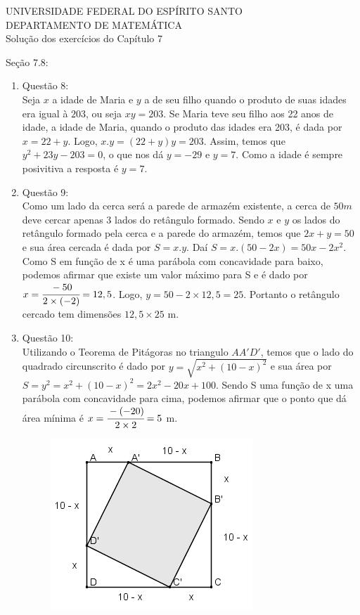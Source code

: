 \documentclass[a4paper]{report}
\begin{document}
\begin{center}
UNIVERSIDADE FEDERAL DO ESPÍRITO SANTO\\DEPARTAMENTO DE MATEMÁTICA\\
\vspace{0.6cm}
Solução dos exercícios do Capítulo 7
\vspace{0.2cm}

\end{center}
Seção 7.8:
\begin{enumerate}
		\item Questão 8:\\Seja $x$ a idade de Maria e $y$ a de seu filho quando o produto de suas idades era igual à $203$, ou seja $xy=203$. Se Maria teve seu filho aos 22 anos de idade, a idade de Maria, quando o produto das idades era 203, é dada por $x = 22 + y$. Logo, $x.y = (22 + y)y = 203$. Assim, temos que $y^2 + 23y - 203 = 0$, o que nos dá $y = -29$ e $y = 7$. Como a idade é sempre posivitiva a resposta é $y = 7$.
		
		\item Questão 9:\\Como um lado da cerca será a parede de armazém existente, a cerca de $50 m$ deve cercar apenas $3$ lados do retângulo formado. Sendo $x$ e $y$ os lados do retângulo formado pela cerca e a parede do armazém, temos que $2x+y=50$ e sua área cercada é dada por $S = x.y$. Daí $S = x.(50 - 2x) = 50x - 2x^2$. Como S em função de x é uma parábola com concavidade para baixo, podemos afirmar que existe um valor máximo para S e é dado por $x=\cfrac{-50}{2\times(-2)} = 12,5$. Logo, $y = 50 - 2\times12,5 = 25$. Portanto o retângulo cercado tem dimensões $12,5\times 25$ m.

		\item Questão 10:\\Utilizando o Teorema de Pitágoras no triangulo $AA'D'$, temos que o lado do quadrado circunscrito é dado por $y=\sqrt{x^2+ (10-x)^2}$ e sua área por $S = y^2 = x^2+ (10-x)^2 = 2x^2-20x+100$. Sendo S uma função de x uma parábola com concavidade para cima, podemos afirmar que o ponto que dá área mínima é $x=\cfrac{-(-20)}{2\times2}=5$ m.
		{
			\begin{figure}[!th]
				\centering
			 	\includegraphics[height=0.3\linewidth]{q10.png}
			\end{figure}
		}	


\end{enumerate}
\end{document}
